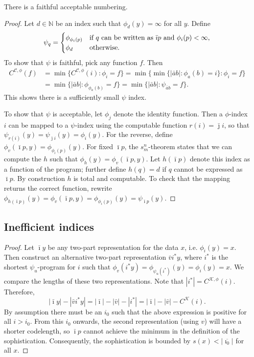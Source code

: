 \documentclass{style/llncs}
\newcommand{\C}{\mathscr C}
\newcommand{\K}{\mathscr K}
\newcommand{\N}{\mathbb N}
\newcommand{\tn}[1]{\textnormal{#1}}
\begin{document}
\begin{lemma}
  There is a faithful acceptable numbering.\label{lemma:faithful-numberings}
\end{lemma}
\begin{proof}
Let $d \in \N$ be an index such that $\phi_d(y)=\infty$ for all $y$. Define
  \[\psi_q=\begin{cases}
    \phi_{\phi_i(p)}&\tn{if $q$ can be written as $\bar\imath p$ and $\phi_i(p)<\infty$,}\\
    \phi_d&\tn{otherwise.}\end{cases}
  \]
  To show that $\psi$ is faithful, pick any function $f$. Then
\[\begin{split}
C^{\C, \phi}(f)&=\min\{C^{\C, \phi}(i):\phi_i=f\} =\min\{\min\{|\bar a b|:\phi_a(b)=i\}:\phi_i=f\} \\
& =\min\{|\bar a b|:\phi_{\phi_a(b)}=f\}
 =\min\{|\bar a b|:\psi_{\bar a b}=f\}.
\end{split}\]
This shows there is a sufficiently small $\psi$ index.

To show that $\psi$ is acceptable, let $\phi_j$ denote the identity
function. Then a $\phi$-index $i$ can be mapped to a $\psi$-index
using the computable function $r(i)=\bar\jmath i$, so that
$\psi_{r(i)}(y)=\psi_{\bar\jmath i}(y)=\phi_i(y)$. For the reverse,
define $\phi_v(\bar\imath p, y)=\phi_{\phi_i(p)}(y)$. For fixed
$\bar\imath p$, the 
$s^n_m$-theorem \cite{kleene193notation} states that we can compute the $h$
such that $\phi_h(y)=\phi_v(\bar\imath p,y)$. Let $h(\bar\imath p)$
denote this index as a function of the program; further define
$h(q)=d$ if $q$ cannot be expressed as $\bar\imath p$. By
construction $h$ is total and computable. To check that the mapping
returns the correct function, rewrite $\phi_{h(\bar\imath
  p)}(y)=\phi_v(\bar\imath p,y)=\phi_{\phi_i(p)}(y)=\psi_{\bar\imath p}(y)$.
\end{proof}

\subsection{Inefficient indices}
\label{section:appendix-inefficient-indices}

\ineffprefix*
\begin{proof}
Let $\bar\imath y$ be any two-part representation for the data $x$, i.e. $\phi_i(y)=x$. Then construct an alternative two-part representation $\bar vi^* y$, where $i^*$ is the shortest $\psi_u$-program for $i$ such that $\phi_v(i^* y)=\phi_{\psi_u(i^*)}(y) = \phi_i(y)=x$. We compare the lengths of these two representations. Note that $|i^*|=C^{\K,\phi}(i)$. Therefore,
\[
|\bar\imath y|-|\bar v i^* y| = |\bar\imath|-|\bar v| - |i^*| = |\bar\imath|-|\bar v|-C^{\K}(i).
\]
By assumption there must be an $i_0$ such that the above expression is positive for all $i>i_0$. From this $i_0$ onwards, the second representation (using $v$) will have a shorter codelength, so $\bar\imath p$ cannot achieve the minimum in the definition of the sophistication. Consequently, the sophistication is bounded by $s(x)<|\overline{\imath_0}|$ for all $x$. 
\end{proof}
\end{document}
